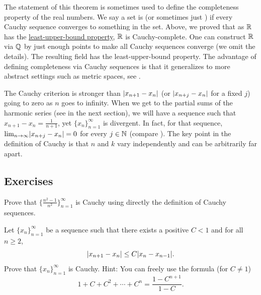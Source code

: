 \begin{remark}
The statement of this theorem is sometimes used to define the
completeness property of the real numbers.  We say a set is
\emph{} (or sometimes just \emph{})
if every Cauchy sequence converges to something in the set.
Above, we proved that
as ${\mathbb{R}}$ has the \hyperref[defn:lub]{least-upper-bound property}, ${\mathbb{R}}$ is 
Cauchy-complete.
One can construct ${\mathbb{R}}$ via
 ${\mathbb{Q}}$ by  just enough points to make all
Cauchy sequences converge (we omit the details).
The resulting field has the
least-upper-bound property.
The advantage of defining completeness via Cauchy
sequences is that it generalizes to
more abstract settings such as metric spaces, see .
\end{remark}

The Cauchy criterion is stronger than 
$\lvert {x_{n+1}-x_n} \rvert$ (or $\lvert {x_{n+j}-x_n} \rvert$ for a fixed $j$) going to zero as
$n$ goes to
infinity.  When we get to the partial sums of the harmonic series
(see  in the next section), we will have
a sequence such that $x_{n+1}-x_n = \frac{1}{n+1}$,
yet $\{ x_n \}_{n=1}^\infty$ is divergent.
In fact, for that sequence,
$\lim_{n\to\infty} \lvert {x_{n+j}-x_n} \rvert = 0$ for
every $j \in {\mathbb{N}}$ (compare ).
The key point in the definition of Cauchy is that $n$ and $k$
vary independently and can be arbitrarily far apart.

\subsection{Exercises}

\begin{exercise}
Prove that $\bigl\{ \frac{n^2-1}{n^2} \bigr\}_{n=1}^\infty$ is Cauchy using directly the definition
of Cauchy sequences.
\end{exercise}

\begin{exercise}
Let $\{ x_n \}_{n=1}^\infty$ be a sequence such that
there exists a positive $C < 1$ and for all $n \geq 2$,
\begin{equation*}
\lvert {x_{n+1} - x_n} \rvert \leq C \lvert {x_{n}-x_{n-1}} \rvert .
\end{equation*}
Prove that $\{ x_n \}_{n=1}^\infty$ is Cauchy.
Hint:  You can freely use the formula (for $C \neq 1$)
\begin{equation*}
1+ C+ C^2 + \cdots + C^n = \frac{1-C^{n+1}}{1-C}.
\end{equation*}
\end{exercise}

